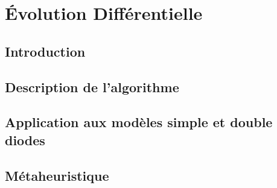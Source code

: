\chapter{Évolution Différentielle}

\section{Introduction}

\section{Description de l'algorithme}

\section{Application aux modèles simple et double diodes}

\section{Métaheuristique}
